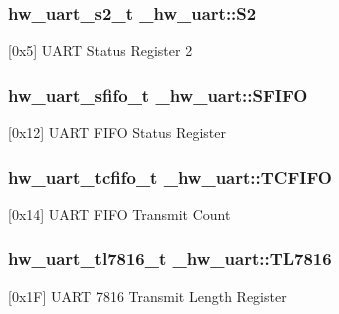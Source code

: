 \subsubsection[{\texorpdfstring{S2}{S2}}]{ {\bf hw\+\_\+uart\+\_\+s2\+\_\+t} \+\_\+hw\+\_\+uart\+::\+S2}\hypertarget{struct__hw__uart_acfe0fe19ec0c86dfa6dee32b05d84a99}{}\label{struct__hw__uart_acfe0fe19ec0c86dfa6dee32b05d84a99}
\mbox{[}0x5\mbox{]} U\+A\+RT Status Register 2 
\subsubsection[{\texorpdfstring{S\+F\+I\+FO}{SFIFO}}]{ {\bf hw\+\_\+uart\+\_\+sfifo\+\_\+t} \+\_\+hw\+\_\+uart\+::\+S\+F\+I\+FO}\hypertarget{struct__hw__uart_abf1430f2e5ecd7d229ab0f9892ad8514}{}\label{struct__hw__uart_abf1430f2e5ecd7d229ab0f9892ad8514}
\mbox{[}0x12\mbox{]} U\+A\+RT F\+I\+FO Status Register 
\subsubsection[{\texorpdfstring{T\+C\+F\+I\+FO}{TCFIFO}}]{ {\bf hw\+\_\+uart\+\_\+tcfifo\+\_\+t} \+\_\+hw\+\_\+uart\+::\+T\+C\+F\+I\+FO}\hypertarget{struct__hw__uart_ab1c535e699e599bde4f6ca1b5f6c98b5}{}\label{struct__hw__uart_ab1c535e699e599bde4f6ca1b5f6c98b5}
\mbox{[}0x14\mbox{]} U\+A\+RT F\+I\+FO Transmit Count 
\subsubsection[{\texorpdfstring{T\+L7816}{TL7816}}]{ {\bf hw\+\_\+uart\+\_\+tl7816\+\_\+t} \+\_\+hw\+\_\+uart\+::\+T\+L7816}\hypertarget{struct__hw__uart_aab6fba53af61f387ec712f73ed5e5382}{}\label{struct__hw__uart_aab6fba53af61f387ec712f73ed5e5382}
\mbox{[}0x1F\mbox{]} U\+A\+RT 7816 Transmit Length Register 
